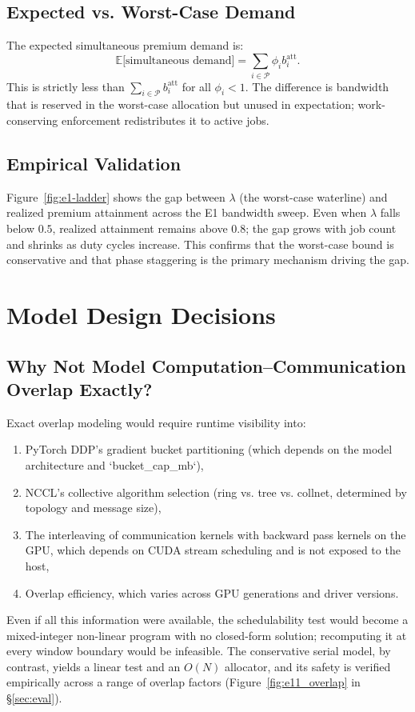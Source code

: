 \subsection{Expected vs. Worst-Case Demand}

The expected simultaneous premium demand is:
\begin{equation}
\mathbb{E}\bigl[\text{simultaneous demand}\bigr] = \sum_{i\in\mathcal{P}} \phi_i b_i^{\mathrm{att}}.
\end{equation}
This is strictly less than $\sum_{i\in\mathcal{P}} b_i^{\mathrm{att}}$ for all $\phi_i < 1$. The difference is bandwidth that is reserved in the worst-case allocation but unused in expectation; work-conserving enforcement redistributes it to active jobs.

\subsection{Empirical Validation}

Figure~\ref{fig:e1-ladder} shows the gap between $\lambda$ (the worst-case waterline) and realized premium attainment across the E1 bandwidth sweep. Even when $\lambda$ falls below $0.5$, realized attainment remains above $0.8$; the gap grows with job count and shrinks as duty cycles increase. This confirms that the worst-case bound is conservative and that phase staggering is the primary mechanism driving the gap.


\section{Model Design Decisions}
\label{sec:design-notes}

\subsection{Why Not Model Computation--Communication Overlap Exactly?}

Exact overlap modeling would require runtime visibility into:
\begin{enumerate}
\item PyTorch DDP's gradient bucket partitioning (which depends on the model architecture and `bucket\_cap\_mb`),
\item NCCL's collective algorithm selection (ring vs. tree vs. collnet, determined by topology and message size),
\item The interleaving of communication kernels with backward pass kernels on the GPU, which depends on CUDA stream scheduling and is not exposed to the host,
\item Overlap efficiency, which varies across GPU generations and driver versions.
\end{enumerate}
Even if all this information were available, the schedulability test would become a mixed-integer non-linear program with no closed-form solution; recomputing it at every window boundary would be infeasible. The conservative serial model, by contrast, yields a linear test and an $O(N)$ allocator, and its safety is verified empirically across a range of overlap factors (Figure~\ref{fig:e11_overlap} in \S\ref{sec:eval}).

